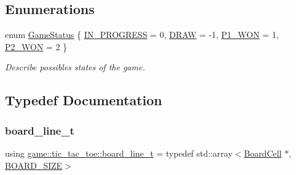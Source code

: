 \subsection*{Enumerations}
\begin{DoxyCompactItemize}
\item 
enum \hyperlink{namespacegame_1_1tic__tac__toe_ad0db24b270912af1e5c2eedaa34409e5}{Game\+Status} \{ \hyperlink{namespacegame_1_1tic__tac__toe_ad0db24b270912af1e5c2eedaa34409e5ada0c2ecabe85165c0e767374ec3916a2}{I\+N\+\_\+\+P\+R\+O\+G\+R\+E\+SS} = 0, 
\hyperlink{namespacegame_1_1tic__tac__toe_ad0db24b270912af1e5c2eedaa34409e5a2c6d0232386e6edce2a3f4393745c4e9}{D\+R\+AW} = -\/1, 
\hyperlink{namespacegame_1_1tic__tac__toe_ad0db24b270912af1e5c2eedaa34409e5ac9693168ae3c964c72ef362e4d60123a}{P1\+\_\+\+W\+ON} = 1, 
\hyperlink{namespacegame_1_1tic__tac__toe_ad0db24b270912af1e5c2eedaa34409e5a9e843cf6a12f9af1997567910ec42387}{P2\+\_\+\+W\+ON} = 2
 \}\begin{DoxyCompactList}\small\item\em Describe possibles states of the game. \end{DoxyCompactList}
\end{DoxyCompactItemize}


\subsection{Typedef Documentation}
\mbox{\label{namespacegame_1_1tic__tac__toe_a3959bb4b3346bd3cdbf5ae9a5c58cacb}} 
\subsubsection{\texorpdfstring{board\+\_\+line\+\_\+t}{board\_line\_t}}
{\footnotesize\ttfamily using \hyperlink{namespacegame_1_1tic__tac__toe_a3959bb4b3346bd3cdbf5ae9a5c58cacb}{game\+::tic\+\_\+tac\+\_\+toe\+::board\+\_\+line\+\_\+t} = typedef std\+::array$<$\hyperlink{classgame_1_1tic__tac__toe_1_1_board_cell}{Board\+Cell} $\ast$, \hyperlink{tic__tac__toe_2_board_8hpp_a1db39eb31d1315ce982608fe25587b6d}{B\+O\+A\+R\+D\+\_\+\+S\+I\+ZE}$>$}

\mbox{\label{namespacegame_1_1tic__tac__toe_a58fc706fe9ae58c6e9045f6927230232}} 
